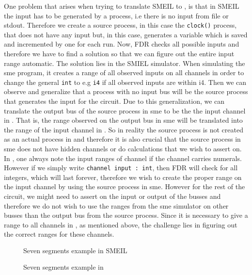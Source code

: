 One problem that arises when trying to translate SMEIL to \cspm, is that in SMEIL the input has to be generated by a process, i.e there is no input from file or stdout.
Therefore we create a source process, in this case the \texttt{clock()} process, that does not have any input but, in this case, generates a variable which is saved and incremented by one for each run.
Now, FDR checks all possible inputs and therefore we have to find a solution so that we can figure out the entire input range automatic.
The solution lies in the SMIEL simulator.
When simulating the sme program, it creates a range of all observed inputs on all channels in order to change the general \texttt{int} to e.g \texttt{i4} if all observed inputs are within i4.
Then we can observe and generalize that a process with no input bus will be the source process that generates the input for the circuit.
Due to this generalization, we can translate the output bus of the source process in sme to be the the input channel in \cspm.
That is, the range observed on the output bus in sme will be translated into the range of the input channel in \cspm.
So in reality the source process is not created as an actual process in \cspm and therefore it is also crucial that the source process in sme does not have hidden channels or do calculations that we wish to assert on. \\
In \cspm, one always note the input ranges of channel if the channel carries numerals. However if we simply write \texttt{channel input : int}, then FDR will check for all integers, which will last forever, therefore we wish to create the proper range on the input channel by using the source process in sme.
However for the rest of the circuit, we might need to assert on the input or output of the busses and therefore we do not wish to use the ranges from the sme simulator on other busses than the output bus from the source process.
Since it is necessary to give a range to all channels in \cspm, as mentioned above, the challenge lies in figuring out the correct ranges for these channels. \\

\begin{figure}
\label{seven_segments_exaple.sme}
\caption{Seven segments example in SMEIL}
\end{figure}


\begin{figure}
\label{seven_segments_exaple.csp}
\caption{Seven segments example in \cspm}
\end{figure}



